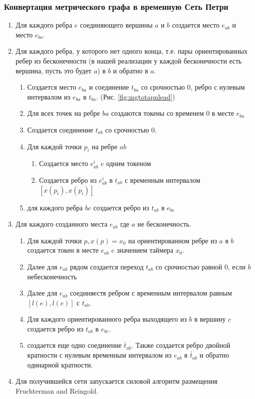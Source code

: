 \documentclass{../TechDoc}
\begin{document}
	\subsubsection{Конвертация метрического графа в временную Сеть Петри\cite{CorMgTapn}}
	\begin{enumerate}
		\item Для каждого ребра $e$ соединяющего вершины $a$ и $b$ создается место $e_{ab}$ и место $e_{ba}$.
		\item Для каждого ребра, у которого нет одного конца, т.е. пары ориентированных ребер из бесконечности (в нашей реализации у каждой бесконечности есть вершина, пусть это будет $a$) в $b$ и обратно в $a$.
		\begin{enumerate}
			\item Создается место $e_{ba}$ и соединение $t_{ba}$ со срочностью 0, ребро с нулевым интервалом из $e_{ba}$ в $t_{ba}$. (Рис. \ref{fig:mgtotapnlead})
			\item Для всех точек на ребре $ba$ создаются токены со временем 0 в месте $e_{ba}$
			\item Создается соединение $t_{ab}$ со срочностью 0.
			\item Для каждой точки $p_i$ на ребре $ab$
			\begin{enumerate}
				\item Создается место $e_{ab}^i$ c одним токеном
				\item Создается ребро из $e_{ab}^i$ в $t_{ab}$ с временным интервалом $[x(p_i), x(p_i)]$
			\end{enumerate}
			\item для каждого ребра $bc$ создается ребро из $t_{ab}$ в $e_{bc}$ 
		\end{enumerate}
		\item Для каждого созданного места ${e_{ab}}$ где $a$ не бесконечность.
		\begin{enumerate}
			\item Для каждой точки $p, x(p) = x_0$ на ориентированном ребре из $a$ в $b$ создается токен в месте $e_{ab}$ c значением таймера $x_0$.
			\item Далее для $e_{ab}$ рядом создается переход $t_{ab}$ со срочностью равной 0, если $b$ небесконечность
			\item Далее для $e_{ab}$ соединяестя ребром с временным интервалом равным $[l(e), l(e)]$ с $t_{ab}$.
			\item Для каждого ориентированного ребра выходящего из $b$ в вершину $c$ создается ребро из $t_{ab}$ в $e_{bc}$.
			\item создается еще одно соединение $\bar{t}_{ab}$. Также создается ребро двойной кратности с нулевым временным интервалом из $e_{ab}$ в $\bar{t}_{ab}$ и обратно одинарной кратности.
		\end{enumerate}
		\item Для получившейся сети запускается силовой алгоритм размещения Fruchterman and Reingold\cite{frlay}.
	\end{enumerate}
\end{document}
